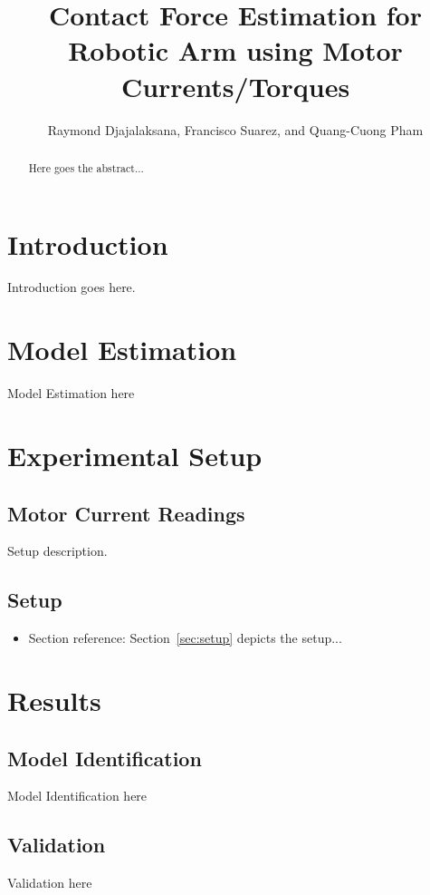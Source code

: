 \documentclass[letterpaper, 10 pt, conference]{ieeeconf}
\title{\LARGE \bf{}
Contact Force Estimation for Robotic Arm using Motor Currents/Torques
}
\author{Raymond Djajalaksana, Francisco Suarez, and Quang-Cuong Pham}
\newcommand{\sref}[1]{Section~\ref{#1}}
\begin{document}
\maketitle
\pagestyle{plain}
\thispagestyle{plain}

\begin{abstract}
Here goes the abstract...
\end{abstract}

\section{Introduction}
Introduction goes here.

\section{Model Estimation}
Model Estimation here

\section{Experimental Setup}
\subsection{Motor Current Readings}
Setup description.
\subsection{Setup}

\begin{itemize}
  \item Section reference: \sref{sec:setup} depicts the setup...
\end{itemize}

\section{Results}

\subsection{Model Identification}
Model Identification here

\subsection{Validation}
Validation here
\end{document}
